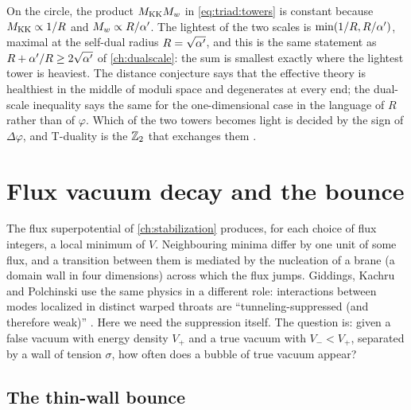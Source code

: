 \begin{physicsbox}
On the circle, the product $M_{\rm KK}M_w$ in \eqref{eq:triad:towers} is constant because
$M_{\rm KK}\propto1/R$ and $M_w\propto R/\alpha'$. The lightest of the two scales is
$\min(1/R,R/\alpha')$, maximal at the self-dual radius $R=\sqrt{\alpha'}$, and this is the same
statement as $R+\alpha'/R\ge2\sqrt{\alpha'}$ of \cref{ch:dualscale}: the sum is smallest exactly where
the lightest tower is heaviest. The distance conjecture says that the effective theory is
healthiest in the middle of moduli space and degenerates at every end; the dual-scale
inequality says the same for the one-dimensional case in the language of $R$ rather than of
$\varphi$. Which of the two towers becomes light is decided by the sign of $\Delta\varphi$,
and T-duality is the $\mathbb{Z}_2$ that exchanges them .
\end{physicsbox}

\section{Flux vacuum decay and the bounce}\label{sec:triad:decay}

The flux superpotential of \cref{ch:stabilization} produces, for each choice of flux integers,
a local minimum of $V$. Neighbouring minima differ by one unit of some flux, and a transition
between them is mediated by the nucleation of a brane (a domain wall in four dimensions)
across which the flux jumps. Giddings, Kachru and Polchinski use the same physics in a different
role: interactions between modes localized in distinct warped throats are
``tunneling-suppressed (and therefore weak)'' . Here we need
the suppression itself. The question is: given a false vacuum with energy density $V_+$ and a
true vacuum with $V_-<V_+$, separated by a wall of tension $\sigma$, how often does a bubble of
true vacuum appear?

\subsection{The thin-wall bounce}

